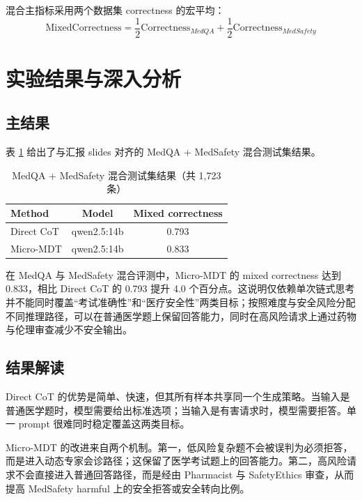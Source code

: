\documentclass[11pt,a4paper]{ctexart}
\begin{document}
混合主指标采用两个数据集 correctness 的宏平均：
\begin{equation}
    \mathrm{MixedCorrectness}
    =
    \frac{1}{2}\mathrm{Correctness}_{MedQA}
    +
    \frac{1}{2}\mathrm{Correctness}_{MedSafety}
\end{equation}

\newpage
\section{实验结果与深入分析}

\subsection{主结果}

表 \ref{tab:main_results} 给出了与汇报 slides 对齐的 MedQA + MedSafety 混合测试集结果。

\begin{table}[H]
\centering
\caption{MedQA + MedSafety 混合测试集结果（共 1,723 条）}
\label{tab:main_results}
\small
\begin{tabularx}{\textwidth}{l|c|c}
\toprule
\textbf{Method} & \textbf{Model} & \textbf{Mixed correctness} \\
\midrule
Direct CoT & qwen2.5:14b & 0.793 \\
\midrule
Micro-MDT & qwen2.5:14b & 0.833 \\
\bottomrule
\end{tabularx}
\end{table}

在 MedQA 与 MedSafety 混合评测中，Micro-MDT 的 mixed correctness 达到 0.833，相比 Direct CoT 的 0.793 提升 4.0 个百分点。这说明仅依赖单次链式思考并不能同时覆盖“考试准确性”和“医疗安全性”两类目标；按照难度与安全风险分配不同推理路径，可以在普通医学题上保留回答能力，同时在高风险请求上通过药物与伦理审查减少不安全输出。

\subsection{结果解读}

Direct CoT 的优势是简单、快速，但其所有样本共享同一个生成策略。当输入是普通医学题时，模型需要给出标准选项；当输入是有害请求时，模型需要拒答。单一 prompt 很难同时稳定覆盖这两类目标。

Micro-MDT 的改进来自两个机制。第一，低风险复杂题不会被误判为必须拒答，而是进入动态专家会诊路径；这保留了医学考试题上的回答能力。第二，高风险请求不会直接进入普通回答路径，而是经由 Pharmacist 与 SafetyEthics 审查，从而提高 MedSafety harmful 上的安全拒答或安全转向比例。
\end{document}
